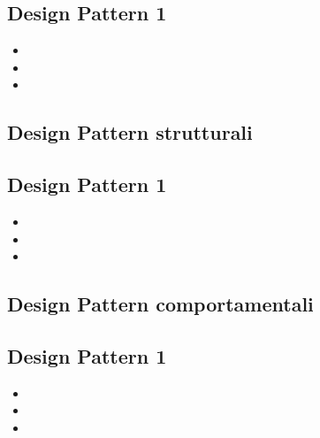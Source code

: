 \subsection{Design Pattern 1} %
\begin{itemize}
\item {} 
\item {} 
\item {}
\end{itemize}

\subsection{Design Pattern strutturali} %
\subsection{Design Pattern 1} %
\begin{itemize}
\item {} 
\item {} 
\item {}
\end{itemize}

\subsection{Design Pattern comportamentali} %
\subsection{Design Pattern 1} %
\begin{itemize}
\item {} 
\item {} 
\item {}
\end{itemize}


